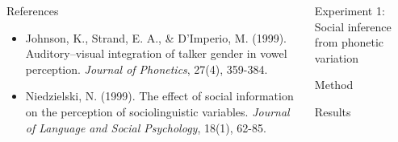 \documentclass[final,hyperref={pdfpagelabels=false}]{beamer}
\begin{document}
\begin{frame}[t]
\begin{columns}[t]
\begin{column}{.20\textwidth}
\begin{block}{References}
\begin{itemize}
\item Johnson, K., Strand, E. A., \& D'Imperio, M. (1999). Auditory–visual integration of talker gender in vowel perception. \textit{Journal of Phonetics}, 27(4), 359-384.

\item Niedzielski, N. (1999). The effect of social information on the perception of sociolinguistic variables. \textit{Journal of Language and Social Psychology}, 18(1), 62-85.

\end{itemize}
\vspace*{1.3cm}
\end{block}




\end{column} %

 
\begin{column}{.38\textwidth} %

\begin{block}{Experiment 1: Social inference from phonetic variation}
\end{block}

\begin{block}{Method}
\end{block}
\begin{block}{Results}
\end{block}



\end{column}
\end{columns}
\end{frame}
\end{document}
